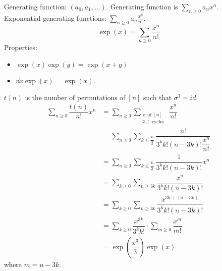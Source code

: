 \documentclass{report}
\begin{document}
Generating function: $(a_{0}, a_{1}, \ldots)$. Generating function is $\sum_{ n\geq 0} a_{n}x^{n}$. Exponential generating functions: $\sum_{n \geq 0}a_{n}\frac{x^{n}}{n!}$.
    \begin{equation*}
        \exp(x) = \sum_{n \geq 0} \dfrac{x^{n}}{n!}
    \end{equation*}
Properties:
    \begin{itemize}
        \item  $\exp(x)\exp(y) = \exp(x + y)$

        \item  $\dd{x}\exp(x) = \exp(x)$. 
    \end{itemize}
\begin{examples}
    \begin{example}
        $t(n)$ is the number of permutations of $[n]$ such that $\sigma^{3} = id$. 
            \begin{align*}
                \sum_{n \geq 0}\dfrac{t(n)}{n!}x^{n} &= \sum_{n \geq 0}\sum_{\substack{\sigma \text{ of } [n] \\ 3, 1 \text{ cycles }}}\dfrac{x^{n}}{n!} \\
                                                     &= \sum_{n \geq 0}\sum_{k \leq \dfrac{n}{3}}\dfrac{n!}{3^{k}k!(n - 3k)!\dfrac{x^{n}}{n!}} \\
                                                     &= \sum_{n \geq 0}\sum_{k \leq \dfrac{n}{3}}\dfrac{1}{3^{k}k!(n - 3k)!}x^{n} \\
                                                     &= \sum_{k \geq 0}\sum_{n \geq 3k} \dfrac{x^{n}}{3^{k}k!(n - 3k)!} \\
                                                     &= \sum_{k \geq 0}\sum_{n \geq 3k}\dfrac{x^{3k + (n - 3k)}}{3^{k}k!(n - 3k)!} \\
                                                     &= \sum_{k \geq 0}\dfrac{x^{3k}}{3^{k}k!} \cdot\sum_{m \geq 0}\dfrac{x^{m}}{m!} \\
                                                     &= \exp(\dfrac{x^{3}}{3})\exp(x)
            \end{align*}
        where $m = n - 3k$.
    \end{example}
\end{examples}
\end{document}
